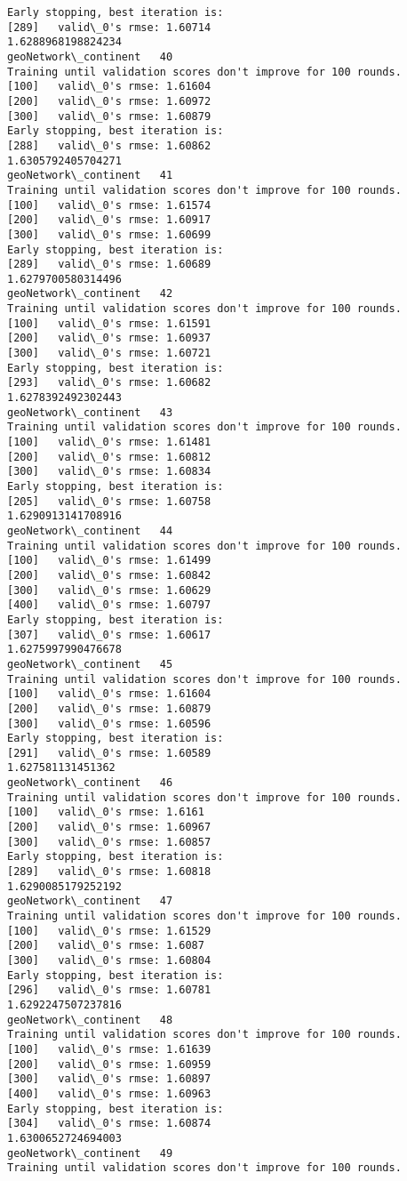 \documentclass[11pt]{article}
\begin{document}
\begin{Verbatim}[commandchars=\\\{\}]
Early stopping, best iteration is:
[289]	valid\_0's rmse: 1.60714
1.6288968198824234
geoNetwork\_continent   40
Training until validation scores don't improve for 100 rounds.
[100]	valid\_0's rmse: 1.61604
[200]	valid\_0's rmse: 1.60972
[300]	valid\_0's rmse: 1.60879
Early stopping, best iteration is:
[288]	valid\_0's rmse: 1.60862
1.6305792405704271
geoNetwork\_continent   41
Training until validation scores don't improve for 100 rounds.
[100]	valid\_0's rmse: 1.61574
[200]	valid\_0's rmse: 1.60917
[300]	valid\_0's rmse: 1.60699
Early stopping, best iteration is:
[289]	valid\_0's rmse: 1.60689
1.6279700580314496
geoNetwork\_continent   42
Training until validation scores don't improve for 100 rounds.
[100]	valid\_0's rmse: 1.61591
[200]	valid\_0's rmse: 1.60937
[300]	valid\_0's rmse: 1.60721
Early stopping, best iteration is:
[293]	valid\_0's rmse: 1.60682
1.6278392492302443
geoNetwork\_continent   43
Training until validation scores don't improve for 100 rounds.
[100]	valid\_0's rmse: 1.61481
[200]	valid\_0's rmse: 1.60812
[300]	valid\_0's rmse: 1.60834
Early stopping, best iteration is:
[205]	valid\_0's rmse: 1.60758
1.6290913141708916
geoNetwork\_continent   44
Training until validation scores don't improve for 100 rounds.
[100]	valid\_0's rmse: 1.61499
[200]	valid\_0's rmse: 1.60842
[300]	valid\_0's rmse: 1.60629
[400]	valid\_0's rmse: 1.60797
Early stopping, best iteration is:
[307]	valid\_0's rmse: 1.60617
1.6275997990476678
geoNetwork\_continent   45
Training until validation scores don't improve for 100 rounds.
[100]	valid\_0's rmse: 1.61604
[200]	valid\_0's rmse: 1.60879
[300]	valid\_0's rmse: 1.60596
Early stopping, best iteration is:
[291]	valid\_0's rmse: 1.60589
1.627581131451362
geoNetwork\_continent   46
Training until validation scores don't improve for 100 rounds.
[100]	valid\_0's rmse: 1.6161
[200]	valid\_0's rmse: 1.60967
[300]	valid\_0's rmse: 1.60857
Early stopping, best iteration is:
[289]	valid\_0's rmse: 1.60818
1.6290085179252192
geoNetwork\_continent   47
Training until validation scores don't improve for 100 rounds.
[100]	valid\_0's rmse: 1.61529
[200]	valid\_0's rmse: 1.6087
[300]	valid\_0's rmse: 1.60804
Early stopping, best iteration is:
[296]	valid\_0's rmse: 1.60781
1.6292247507237816
geoNetwork\_continent   48
Training until validation scores don't improve for 100 rounds.
[100]	valid\_0's rmse: 1.61639
[200]	valid\_0's rmse: 1.60959
[300]	valid\_0's rmse: 1.60897
[400]	valid\_0's rmse: 1.60963
Early stopping, best iteration is:
[304]	valid\_0's rmse: 1.60874
1.6300652724694003
geoNetwork\_continent   49
Training until validation scores don't improve for 100 rounds.

\end{Verbatim}
\end{document}
